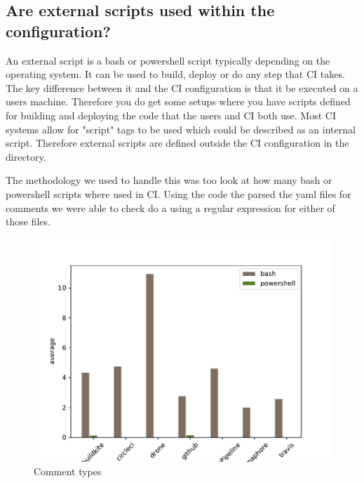 \documentclass[twoside,12pt,titlepage,a4paper]{article}
\begin{document}
\pagebreak

\vspace*{-0.05in}
\subsection{Are external scripts used within the configuration?}
\vspace*{-0.05in}

An external script is a bash or powershell script typically depending on the operating system. It can be used to build, deploy or do any step that CI takes. The key difference between it and the CI configuration is that it be executed on a users machine. Therefore you do get some setups where you have scripts defined for building and deploying the code that the users and CI both use. Most CI systems allow for "script" tags to be used which could be described as an internal script. Therefore external scripts are defined outside the CI configuration in the directory.

The methodology we used to handle this was too look at how many bash or powershell scripts where used in CI. Using the code the parsed the yaml files for comments we were able to check do a using a regular expression for either of those files.  


\begin{figure}[!ht]
  \centering
  \begin{minipage}[!t]{.48\textwidth}
      \includegraphics[width=\textwidth]{../src/results/scripts usage bars.pdf}
      \caption[alt text]{Comment types}
      \label{fig:script_usage}  
  \end{minipage}%
  \hfill
  \begin{minipage}[!t]{.48\textwidth}
    
  \end{minipage}
\end{figure}
\end{document}
